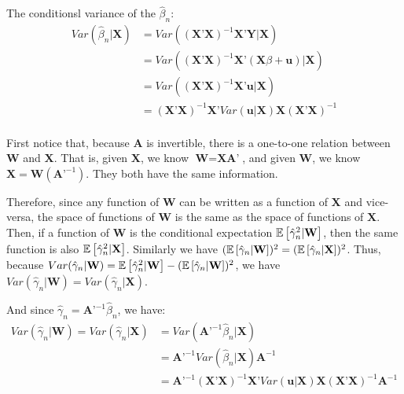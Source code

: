 \documentclass[12pt]{paper}
\begin{document}
The conditionsl variance of the $\hat{\beta}_n$:
\begin{equation}
\begin{split}
Var(\hat{\beta}_n|\textbf{X})&=Var((\textbf{X'X})^{-1}\textbf{X'Y}|\textbf{X})\\
&=Var((\textbf{X'X})^{-1}\textbf{X'}(\textbf{X}\beta+\textbf{u})|\textbf{X})\\
&=Var((\textbf{X'X})^{-1}\textbf{X'}\textbf{u}|\textbf{X})\\
&=(\textbf{X'X})^{-1}\textbf{X'}Var(\textbf{u}|\textbf{X})\textbf{X}(\textbf{X'X})^{-1}\\
\end{split}
\end{equation}

First notice that, because $\textbf{A}$ is invertible, there is a one-to-one relation between $\textbf{W}$ and $\textbf{X}$. That is, given $\textbf{X}$, we know $\textbf{W}=\textbf{XA'}$, and given $\textbf{W}$, we know $\textbf{X}=\textbf{W}(\textbf{A'}^{-1})$. They both have the same information.

 Therefore, since any function of $\textbf{W}$ can be written as a function of $\textbf{X}$ and vice-versa, the space of functions of $\textbf{W}$ is the same as the space of functions of $\textbf{X}$. Then, if a function of $\textbf{W}$ is the conditional expectation $\mathbb{E} \left [ \hat{\gamma}_n^2|\textbf{W} \right ]$, then the same function is also $\mathbb{E} \left [ \hat{\gamma}_n^2|\textbf{X} \right ]$. Similarly we have $(\mathbb{E} \left [ \hat{\gamma}_n|\textbf{W} \right ])^2=(\mathbb{E} \left [ \hat{\gamma}_n|\textbf{X} \right ])^2$. Thus, because $Var(\hat{\gamma}_n|\textbf{W})=\mathbb{E} \left [ \hat{\gamma}_n^2|\textbf{W} \right ]-(\mathbb{E} \left [ \hat{\gamma}_n|\textbf{W} \right ])^2$,  we have $Var(\hat{\gamma}_n|\textbf{W})=Var(\hat{\gamma}_n|\textbf{X})$.

And since $\hat{\gamma}_n=\textbf{A'}^{-1}\hat{\beta}_n$, we have:
\begin{equation}
\begin{split}
Var(\hat{\gamma}_n|\textbf{W})=Var(\hat{\gamma}_n|\textbf{X})&=Var(\textbf{A'}^{-1}\hat{\beta}_n|\textbf{X})\\
&=\textbf{{A'}}^{-1}Var(\hat{\beta}_n|\textbf{X})\textbf{A}^{-1}\\
&=\textbf{{A'}}^{-1}(\textbf{X'X})^{-1}\textbf{X'}Var(\textbf{u}|\textbf{X})\textbf{X}(\textbf{X'X})^{-1}\textbf{A}^{-1}\\
\end{split}
\end{equation}

\end{document}
